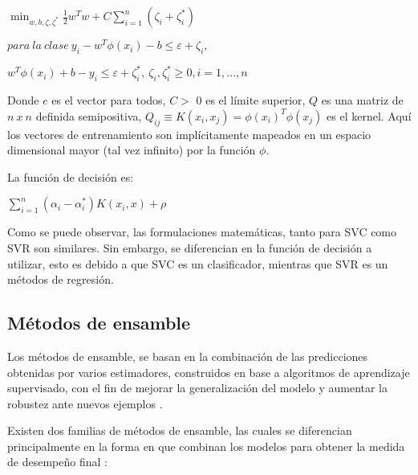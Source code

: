 \begin{center}
	
	$\min_ {w, b, \zeta, \zeta^*} \frac{1}{2} w^T w + C \sum_{i=1}^{n} (\zeta_i + \zeta_i^*)
	$
\end{center}

\begin{center}
	
	$para\ la\ clase\ y_i - w^T \phi (x_i) - b \leq \varepsilon + \zeta_i,$
\end{center}
\begin{center}
	$w^T \phi (x_i) + b - y_i \leq \varepsilon + \zeta_i^*,\ \zeta_i, \zeta_i^* \geq 0, i=1, ..., n$	
\end{center}

Donde $e$ es el vector para todos, $C >$ 0 es el límite superior, $Q$ es una matriz de $n\ x\ n$ definida semipositiva, $Q_{ij} \equiv K(x_i, x_j) = \phi (x_i)^T \phi (x_j)$ es el kernel. Aquí los vectores de
entrenamiento son implícitamente mapeados en un espacio dimensional mayor (tal vez infinito) por
la función $\phi$.

La función de decisión es:

\begin{center}
	$\sum_{i=1}^n (\alpha_i - \alpha_i^*) K(x_i, x) + \rho$
\end{center}

Como se puede observar, las formulaciones matemáticas, tanto para SVC como SVR son similares. Sin embargo, se diferencian en la función de decisión a utilizar, esto es debido a que SVC es un clasificador, mientras que SVR es un métodos de regresión.

\subsection{Métodos de ensamble}

Los métodos de ensamble, se basan en la combinación de las predicciones obtenidas por varios estimadores, construidos en base a algoritmos de aprendizaje supervisado, con el fin de mejorar la generalización del modelo y aumentar la robustez ante nuevos ejemplos \cite{dietterich2000ensemble}.

Existen dos familias de métodos de ensamble, las cuales se diferencian principalmente en la forma en que combinan los modelos para obtener la medida de desempeño final \cite{kotsiantis2007supervised}:

